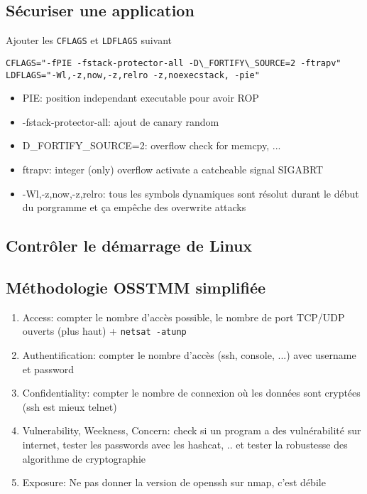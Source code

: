 \subsection{Sécuriser une application}
Ajouter les \verb!CFLAGS! et \verb!LDFLAGS! suivant
\begin{lstlisting}[style=bash]
CFLAGS="-fPIE -fstack-protector-all -D\_FORTIFY\_SOURCE=2 -ftrapv"
LDFLAGS="-Wl,-z,now,-z,relro -z,noexecstack, -pie"
\end{lstlisting}
\begin{itemize}
\item PIE: position independant executable pour avoir ROP
\item -fstack-protector-all: ajout de canary random
\item D\_FORTIFY\_SOURCE=2: overflow check for memcpy, ...
\item ftrapv: integer (only) overflow activate a catcheable signal SIGABRT
\item -Wl,-z,now,-z,relro: tous les symbols dynamiques sont résolut durant le début du porgramme et ça empêche des overwrite attacks
\end{itemize}

\subsection{Contrôler le démarrage de Linux}

\subsection{Méthodologie OSSTMM simplifiée}
\begin{enumerate}
\item Access: compter le nombre d'accès possible, le nombre de port TCP/UDP ouverts (plus haut) + \verb!netsat -atunp!
\item Authentification: compter le nombre d'accès (ssh, console, ...) avec username et password
\item Confidentiality: compter le nombre de connexion où les données sont cryptées (ssh est mieux telnet)
\item Vulnerability, Weekness, Concern: check si un program a des vulnérabilité sur internet, tester les passwords avec les hashcat, .. et tester la robustesse des algorithme de cryptographie
\item Exposure: Ne pas donner la version de openssh sur nmap, c'est débile
\end{enumerate}
